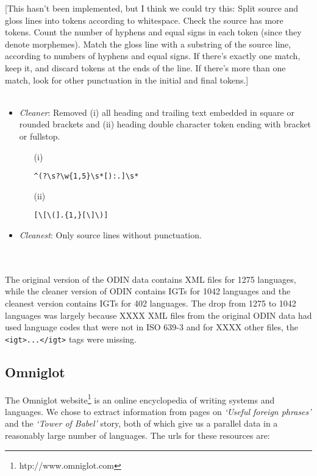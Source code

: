 \documentclass[11pt]{article}
\begin{document}
[This hasn't been implemented, but I think we could try this: Split source and gloss lines into tokens according to whitespace. Check the source has more tokens. Count the number of hyphens and equal signs in each token (since they denote morphemes). Match the gloss line with a substring of the source line, according to numbers of hyphens and equal signs. If there's exactly one match, keep it, and discard tokens at the ends of the line. If there's more than one match, look for other punctuation in the initial and final tokens.]
\\ \\
\begin{minipage}{\columnwidth}
\begin{itemize}
\item \emph{Cleaner}: Removed (i) all heading and trailing text embedded in square or rounded brackets and (ii) heading double character token ending with bracket or fullstop.
\begin{itemize}
\item[(i)]
\begin{Verbatim}
^(?\s?\w{1,5}\s*[):.]\s*
\end{Verbatim}
\item[(ii)] 
\begin{Verbatim}
[\[\(].{1,}[\]\)]
\end{Verbatim}
\end{itemize}
\item \emph{Cleanest}: Only source lines without punctuation.
\end{itemize}
\end{minipage}
\\ \\

\noindent The original version of the ODIN data contains XML files for 1275 languages, while the cleaner version of ODIN contains IGTs for 1042 languages and the cleanest version contains IGTs for 402 languages. The drop from 1275 to 1042 languages was largely because {\color{red} XXXX} XML files from the original ODIN data had used language codes that were not in ISO 639-3 and for {\color{red} XXXX} other files, the \texttt{<igt>...</igt>} tags were missing. 

\subsection{Omniglot}

The Omniglot website\footnote{htp://www.omniglot.com} is an online encyclopedia of writing systems and languages. We chose to extract information from pages on \emph{`Useful foreign phrases'} and the \emph{`Tower of Babel'} story, both of which give us a parallel data in a reasonably large number of languages. The urls for these resources are:
\end{document}
